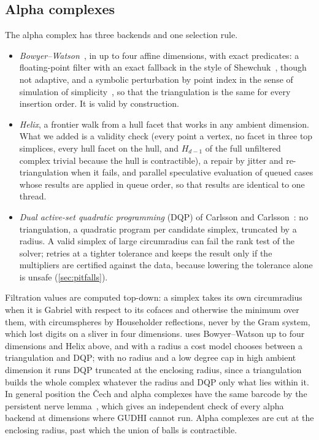 \subsection{Alpha complexes}\label{sec:alpha}

The alpha complex has three backends and one selection rule.
\begin{itemize}[leftmargin=1.5em, itemsep=2pt]
\item \emph{Bowyer--Watson}~\cite{bowyer1981computing,watson1981computing}, in up to four affine dimensions, with exact
  predicates: a floating-point filter with an exact fallback in the style of Shewchuk~\cite{shewchuk1997adaptive}, though not adaptive,
  and a symbolic perturbation by point index in the sense of simulation of simplicity~\cite{edelsbrunner1990simulation}, so that the
  triangulation is the same for every insertion order. It is valid by construction.
\item \emph{Helix}, a frontier walk from a hull facet that works in any ambient dimension.
  What we added is a validity check (every point a vertex, no facet in three top simplices, every hull facet on the hull, and
  $H_{d-1}$ of the full unfiltered complex trivial because the hull is contractible), a repair by jitter and
  re-triangulation when it fails, and parallel speculative evaluation of queued cases whose results are applied in queue order, so that
  results are identical to one thread.
\item \emph{Dual active-set quadratic programming} (DQP) of Carlsson and Carlsson~\cite{carlsson2023alpha}: no triangulation, a
  quadratic program per candidate simplex, truncated by a radius. A valid simplex of large circumradius can fail the rank
  test of the solver; \tdaj{} retries at a tighter tolerance and keeps the result only if the multipliers are certified against
  the data, because lowering the tolerance alone is unsafe (\cref{sec:pitfalls}).
\end{itemize}
Filtration values are computed top-down: a simplex takes its own circumradius when it is Gabriel with respect to its cofaces
and otherwise the minimum over them, with circumspheres by Householder reflections, never by the Gram system, which lost
digits on a sliver in four dimensions.  uses Bowyer--Watson up to four dimensions and Helix above, and with a radius a cost
model chooses between a triangulation and DQP; with no radius and a low degree cap in high ambient dimension it runs DQP
truncated at the enclosing radius, since a triangulation builds the whole complex whatever the radius and DQP only what lies
within it.
In general position the \v{C}ech and alpha complexes have the same barcode by the persistent nerve
lemma~\cite{chazal2008persistence}, which gives an independent check of every alpha backend at dimensions where GUDHI cannot run.
Alpha complexes are cut at the enclosing radius, past which the union of balls is contractible.

